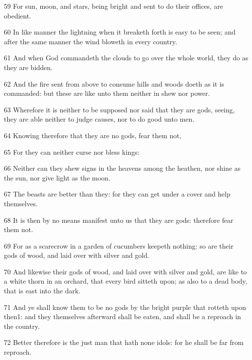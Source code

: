 \par 59 For sun, moon, and stars, being bright and sent to do their offices, are obedient.
\par 60 In like manner the lightning when it breaketh forth is easy to be seen; and after the same manner the wind bloweth in every country.
\par 61 And when God commandeth the clouds to go over the whole world, they do as they are bidden.
\par 62 And the fire sent from above to consume hills and woods doeth as it is commanded: but these are like unto them neither in shew nor power.
\par 63 Wherefore it is neither to be supposed nor said that they are gods, seeing, they are able neither to judge causes, nor to do good unto men.
\par 64 Knowing therefore that they are no gods, fear them not,
\par 65 For they can neither curse nor bless kings:
\par 66 Neither can they shew signs in the heavens among the heathen, nor shine as the sun, nor give light as the moon.
\par 67 The beasts are better than they: for they can get under a cover and help themselves.
\par 68 It is then by no means manifest unto us that they are gods: therefore fear them not.
\par 69 For as a scarecrow in a garden of cucumbers keepeth nothing: so are their gods of wood, and laid over with silver and gold.
\par 70 And likewise their gods of wood, and laid over with silver and gold, are like to a white thorn in an orchard, that every bird sitteth upon; as also to a dead body, that is east into the dark.
\par 71 And ye shall know them to be no gods by the bright purple that rotteth upon then1: and they themselves afterward shall be eaten, and shall be a reproach in the country.
\par 72 Better therefore is the just man that hath none idols: for he shall be far from reproach.



